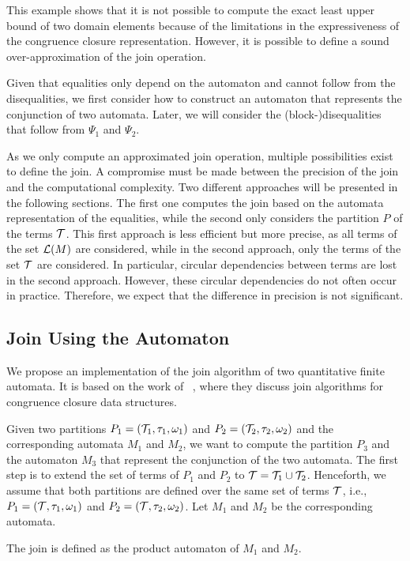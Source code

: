 This example shows that it is not possible to compute the exact least upper bound of two domain elements because of the limitations in the expressiveness of the congruence closure representation.
However, it is possible to define a sound over-approximation of the join operation.

Given that equalities only depend on the automaton and cannot follow from the disequalities, we first consider how to construct an automaton that represents the conjunction of two automata.
Later, we will consider the (block-)disequalities that follow from $\Psi_1$ and $\Psi_2$.

As we only compute an approximated join operation, multiple possibilities exist to define the join.
A compromise must be made between the precision of the join and the computational complexity.
Two different approaches will be presented in the following sections.
The first one computes the join based on the automata representation of the equalities, while the second only considers the partition $P$ of the terms $\mathcal{T}$.
This first approach is less efficient but more precise, as all terms of the set $\mathcal{L}(M)$ are considered, while in the second approach, only the terms of the set $\mathcal{T}$ are considered.
In particular, circular dependencies between terms are lost in the second approach.
However, these circular dependencies do not often occur in practice.
Therefore, we expect that the difference in precision is not significant.
\subsection{Join Using the Automaton}

We propose an implementation of the join algorithm of two quantitative finite automata.
It is based on the work of ~\textcite{join}, where they discuss join algorithms for congruence closure data structures.

Given two partitions $P_1 = (\mathcal{T}_1, \tau_1, \omega_1)$ and $P_2 = (\mathcal{T}_2, \tau_2, \omega_2)$ and the corresponding automata $M_1$ and $M_2$, we want to compute the partition $P_3$ and the automaton $M_3$ that represent the conjunction of the two automata.
The first step is to extend the set of terms of $P_1$ and $P_2$ to $\mathcal{T} = \mathcal{T}_1 \cup \mathcal{T}_2$.
Henceforth, we assume that both partitions are defined over the same set of terms $\mathcal{T}$,
i.e., $P_1 = (\mathcal{T}, \tau_1, \omega_1)$ and $P_2 = (\mathcal{T}, \tau_2, \omega_2)$.
Let $M_1$ and $M_2$ be the corresponding automata.

The join is defined as the product automaton of $M_1$ and $M_2$.


